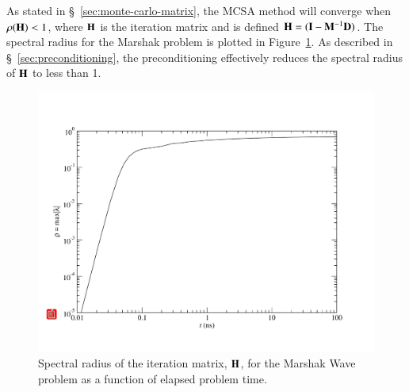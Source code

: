 \documentclass[preprint,12pt]{elsarticle}
\newcommand{\vI}{\ensuremath{\ve{I}}}
\begin{document}
As stated in \S~\ref{sec:monte-carlo-matrix}, the MCSA method will converge
when $\rho(\mathbf{H})< 1$, where $\mathbf{H}$ is the iteration matrix and is defined
$\ve{H} = (\vI - \ve{M}^{-1}\ve{D})$.  The spectral radius for the Marshak
problem is plotted in Figure~\ref{fig:marshak_spectral}.  As described in
\S~\ref{sec:preconditioning}, the preconditioning effectively reduces the
spectral radius of $\mathbf{H}$ to less than 1.
\begin{figure}[ht!]
  \centerline{ \includegraphics[width=5in,clip]{spectral_radius.pdf}}
  \caption{Spectral radius of the iteration matrix, $\mathbf{H}$, for the
    Marshak Wave problem as a function of elapsed problem time.}
  \label{fig:marshak_spectral}
\end{figure}
\end{document}
